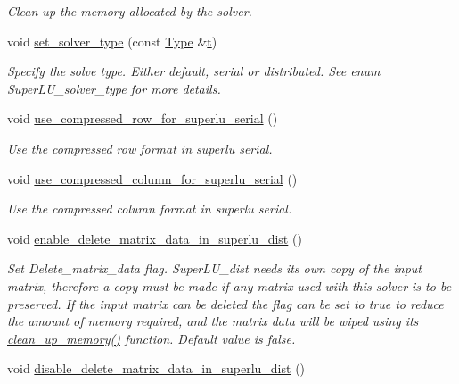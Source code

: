 \begin{DoxyCompactItemize}
\begin{DoxyCompactList}\small\item\em Clean up the memory allocated by the solver. \end{DoxyCompactList}\item 
void \hyperlink{classoomph_1_1SuperLUSolver_a7d59158ece5d377644f598ca60093be1}{set\+\_\+solver\+\_\+type} (const \hyperlink{classoomph_1_1SuperLUSolver_a55d3709b5e082ecce2b41f9db6716e1a}{Type} \&\hyperlink{cfortran_8h_af6f0bd3dc13317f895c91323c25c2b8f}{t})
\begin{DoxyCompactList}\small\item\em Specify the solve type. Either default, serial or distributed. See enum Super\+L\+U\+\_\+solver\+\_\+type for more details. \end{DoxyCompactList}\item 
void \hyperlink{classoomph_1_1SuperLUSolver_ad0d31829d3afe5f7a315d1b37693e8a2}{use\+\_\+compressed\+\_\+row\+\_\+for\+\_\+superlu\+\_\+serial} ()
\begin{DoxyCompactList}\small\item\em Use the compressed row format in superlu serial. \end{DoxyCompactList}\item 
void \hyperlink{classoomph_1_1SuperLUSolver_abd96a292e666e7553651add727265529}{use\+\_\+compressed\+\_\+column\+\_\+for\+\_\+superlu\+\_\+serial} ()
\begin{DoxyCompactList}\small\item\em Use the compressed column format in superlu serial. \end{DoxyCompactList}\item 
void \hyperlink{classoomph_1_1SuperLUSolver_a9b8487741998c97db3f41493ca427c1d}{enable\+\_\+delete\+\_\+matrix\+\_\+data\+\_\+in\+\_\+superlu\+\_\+dist} ()
\begin{DoxyCompactList}\small\item\em Set Delete\+\_\+matrix\+\_\+data flag. Super\+L\+U\+\_\+dist needs its own copy of the input matrix, therefore a copy must be made if any matrix used with this solver is to be preserved. If the input matrix can be deleted the flag can be set to true to reduce the amount of memory required, and the matrix data will be wiped using its \hyperlink{classoomph_1_1SuperLUSolver_aec78b96a8f831a89f9b8fb48b1ce0c68}{clean\+\_\+up\+\_\+memory()} function. Default value is false. \end{DoxyCompactList}\item 
void \hyperlink{classoomph_1_1SuperLUSolver_a887c4a5fd19034f7a74d91d453d4f425}{disable\+\_\+delete\+\_\+matrix\+\_\+data\+\_\+in\+\_\+superlu\+\_\+dist} ()

\end{DoxyCompactItemize}

